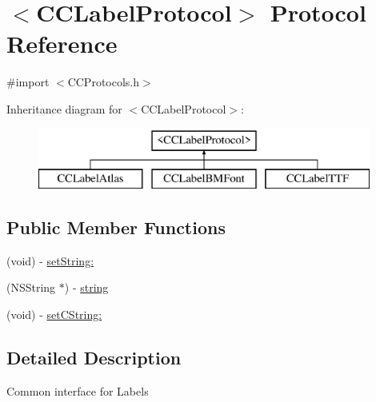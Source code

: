 \hypertarget{protocol_c_c_label_protocol-p}{\section{$<$C\-C\-Label\-Protocol$>$ Protocol Reference}
\label{protocol_c_c_label_protocol-p}
}


{\ttfamily \#import $<$C\-C\-Protocols.\-h$>$}

Inheritance diagram for $<$C\-C\-Label\-Protocol$>$\-:\begin{figure}[H]
\begin{center}
\leavevmode
\includegraphics[height=2.000000cm]{protocol_c_c_label_protocol-p}
\end{center}
\end{figure}
\subsection*{Public Member Functions}
\begin{DoxyCompactItemize}
\item 
(void) -\/ \hyperlink{protocol_c_c_label_protocol-p_a319778fa4130a457caaf5c5d08e7f420}{set\-String\-:}
\item 
(N\-S\-String $\ast$) -\/ \hyperlink{protocol_c_c_label_protocol-p_a7abd87f94271d0a704d74e1889226068}{string}
\item 
(void) -\/ \hyperlink{protocol_c_c_label_protocol-p_abfddc43d2cfac1ec569efd0450e28048}{set\-C\-String\-:}
\end{DoxyCompactItemize}


\subsection{Detailed Description}
Common interface for Labels 

